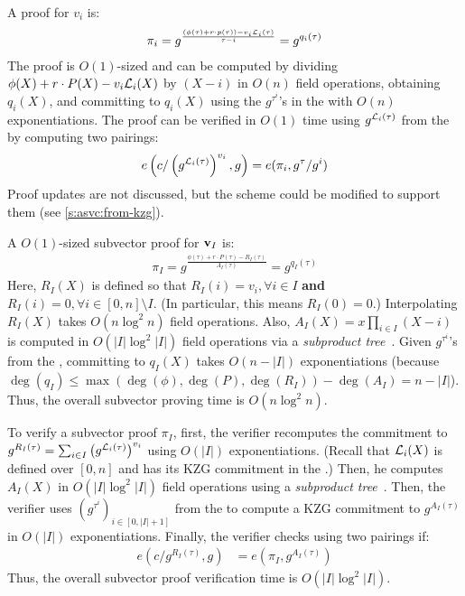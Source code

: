 A proof for $v_i$ is:
\begin{align}
\pi_i = g^{\frac{\left(\phi(\tau)+r\cdot p(\tau)\right)-v_i\mathcal{L}_i(\tau)}{\tau - i}} = g^{q_i(\tau)}
\end{align}
The proof is $O(1)$-sized and can be computed by dividing $\phi(X)+r\cdot P(X)-v_i\mathcal{L}_i(X)$ by $(X-i)$ in $O(n)$ field operations, obtaining $q_i(X)$, and committing to $q_i(X)$ using the $g^{\tau^i}$'s in the \prk with $O(n)$ exponentiations.
The proof can be verified in $O(1)$ time using $g^{\mathcal{L}_i(\tau)}$ from the \vrk by computing two pairings:
\begin{align}
e\left(c/\left(g^{\mathcal{L}_i(\tau)}\right)^{v_i}, g\right) = e(\pi_i, g^{\tau}/g^{i})
\end{align}
Proof updates are not discussed, but the scheme could be modified to support them (see \cref{s:asvc:from-kzg}).

A $O(1)$-sized subvector proof for $\bm{\mathrm{v}}_I$ is:
\begin{align}
\pi_I=g^\frac{\phi(\tau)+r\cdot P(\tau) - R_I(\tau)}{A_I(\tau)}=g^{q_I(\tau)}
\end{align}
Here, $R_I(X)$ is defined so that $R_I(i) = v_i,\forall i\in I$ \textbf{and} $R_I(i) = 0, \forall i \in [0,n]\setminus I$.
(In particular, this means $R_I(0) = 0$.)
Interpolating $R_I(X)$ takes $O(n\log^2{n})$ field operations.
Also, $A_I(X)= x\prod_{i\in I} (X-i)$ is computed in $O(|I|\log^2{|I|})$ field operations via a \textit{subproduct tree}~\cite{vG13ModernCh10}.
Given $g^{\tau^i}$'s from the \prk, committing to $q_I(X)$ takes $O(n-|I|)$ exponentiations (because $\deg(q_I)\le \max(\deg(\phi),\deg(P),\deg(R_I))-\deg(A_I)=n-|I|$).
Thus, the overall subvector proving time is $O(n\log^2{n})$.

To verify a subvector proof $\pi_I$, first, the verifier recomputes the commitment to $g^{R_I(\tau)}=\sum_{i\in I} \left(g^{\mathcal{L}_i(\tau)}\right)^{v_i}$ using $O(|I|)$ exponentiations.
(Recall that $\mathcal{L}_i(X)$ is defined over $[0,n]$ and has its KZG commitment in the \vrk.)
Then, he computes $A_I(X)$ in $O(|I|\log^2{|I|})$ field operations using a \textit{subproduct tree}~\cite{vG13ModernCh10}.
Then, the verifier uses $(g^{\tau^i})_{i\in [0,|I|+1]}$ from the \vrk to compute a KZG commitment to $g^{A_I(\tau)}$ in $O(|I|)$ exponentiations.
Finally, the verifier checks using two pairings if:
\begin{align}
e(c/g^{R_I(\tau)},g) &= e(\pi_I, g^{A_I(\tau)})
\end{align}
Thus, the overall subvector proof verification time is $O(|I|\log^2{|I|})$.

